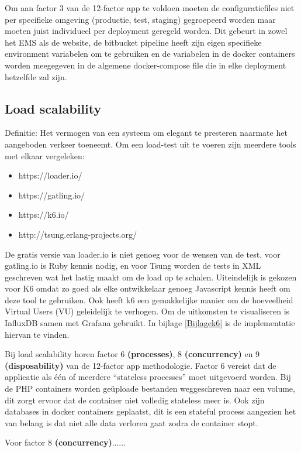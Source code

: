 Om aan factor 3 van de 12-factor app te voldoen moeten de configuratiefiles niet per specifieke omgeving (productie, test, staging) gegroepeerd worden maar moeten juist individueel per deployment geregeld worden. Dit gebeurt in zowel het EMS als de website, de bitbucket pipeline heeft zijn eigen specifieke environment variabelen om te gebruiken en de variabelen in de docker containers worden meegegeven in de algemene docker-compose file die in elke deployment hetzelfde zal zijn.

\subsection{Load scalability}
Definitie: Het vermogen van een systeem om elegant te presteren naarmate het aangeboden verkeer toeneemt. Om een load-test uit te voeren zijn meerdere tools met elkaar vergeleken:
\begin{itemize}
	\item https://loader.io/
	\item https://gatling.io/
	\item https://k6.io/
	\item http://tsung.erlang-projects.org/
\end{itemize}

De gratis versie van loader.io is niet genoeg voor de wensen van de test, voor gatling.io is Ruby kennis nodig, en voor Tsung worden de tests in XML geschreven wat het lastig maakt om de load op te schalen. Uiteindelijk is gekozen voor K6 omdat zo goed als elke ontwikkelaar genoeg Javascript kennis heeft om deze tool te gebruiken. Ook heeft k6 een gemakkelijke manier om de hoeveelheid Virtual Users (VU) geleidelijk te verhogen. Om de uitkomsten te visualiseren is InfluxDB samen met Grafana gebruikt. In bijlage \ref{Bijlagek6} is de implementatie hiervan te vinden.

Bij load scalability horen factor 6 \textbf{(processes)}, 8 \textbf{(concurrency)} en 9 \textbf{(disposability)} van de 12-factor app methodologie. Factor 6 vereist dat de applicatie als één of meerdere \enquote{stateless processes} moet uitgevoerd worden. Bij de PHP containers worden geüploade bestanden weggeschreven naar een volume, dit zorgt ervoor dat de container niet volledig stateless meer is. Ook zijn databases in docker containers geplaatst, dit is een stateful process aangezien het van belang is dat niet alle data verloren gaat zodra de container stopt.

Voor factor 8 \textbf{(concurrency)}......

